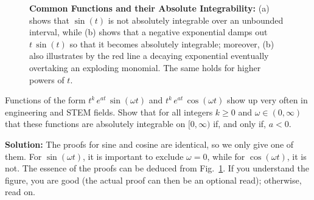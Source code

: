 \bigskip

\begin{figure}[htb]%
\centering
\hfill
{}%
\hfill%
%
\hspace*{1cm}
    \caption[]{\textbf{Common Functions and their Absolute Integrability:} (a) shows that $\sin(t)$ is not absolutely integrable over an unbounded interval, while (b) shows that a negative exponential damps out $t\, \sin(t)$ so that it becomes absolutely integrable; moreover, (b) also illustrates by the red line a decaying exponential eventually overtaking an exploding monomial. The same holds for higher powers of $t$.}
    \label{fig:CommonFunctionsAndTheirAbsoluteIntegrability}
\end{figure}
\bigskip
\begin{example} 
\label{ex:AbsoluteIntegrability}
Functions of the form $t^k\,e^{at}\, \sin(\omega t)$ and $t^k\,e^{at}\, \cos(\omega t)$ show up very often in engineering and STEM fields. Show that for all integers $k\ge 0$ and $\omega \in (0, \infty)$ that these functions are absolutely integrable on $[0, \infty)$ if, and only if, $a < 0$. 
\end{example}
\textbf{Solution:} The proofs for sine and cosine are identical, so we only give one of them. For $\sin(\omega t)$, it is important to exclude $\omega = 0$, while for $\cos(\omega t)$, it is not. The essence of the proofs can be deduced from Fig.~\ref{fig:CommonFunctionsAndTheirAbsoluteIntegrability}. If you understand the figure, you are good (the actual proof can then be an optional read); otherwise, read on.\\

